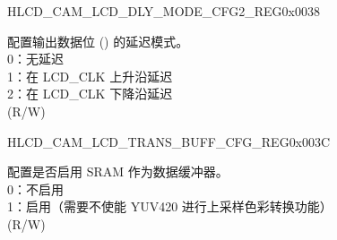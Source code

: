 \begin{register}{H}{LCD\_CAM\_LCD\_DLY\_MODE\_CFG2\_REG}{0x0038}\label{regdesc:LCDCAMLCDDLYMODECFG2REG}
%
%
%
%
%
%
%
%
%
%
%
%
%
%
%
%
\regnewline%
\begin{regdesc}\begin{reglist}
\label{fielddesc:LCDCAMDOUT0MODE}\item [LCD\_CAM\_DOUT\regindex{n}\_MODE (\regindex{n}: 0 - 15)] 配置输出数据位 () 的延迟模式。\\
0：无延迟\\
1：在 LCD\_CLK 上升沿延迟\\
2：在 LCD\_CLK 下降沿延迟\\
(R/W)
\end{reglist}\end{regdesc}
\end{register}

\begin{register}{H}{LCD\_CAM\_LCD\_TRANS\_BUFF\_CFG\_REG}{0x003C}\label{regdesc:LCDCAMLCDTRANSBUFFCFGREG}
%
%
\regnewline%
\begin{regdesc}\begin{reglist}
\label{fielddesc:LCDCAMLCDTRANSBUFFERENA}\item [LCD\_CAM\_LCD\_TRANS\_BUFFER\_ENA] 配置是否启用 SRAM 作为数据缓冲器。\\
0：不启用\\
1：启用（需要不使能 YUV420 进行上采样色彩转换功能）\\
(R/W)
\end{reglist}\end{regdesc}
\end{register}

